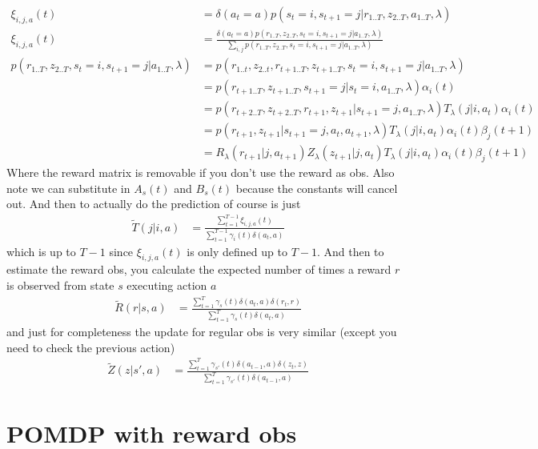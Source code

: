 \documentclass[10pt,english]{article}
\begin{document}
\begin{align}
\xi_{i,j,a}(t) &= \delta(a_t=a)p(s_t=i,s_{t+1}=j|r_{1..T},z_{2..T},a_{1..T},\lambda) \\
\xi_{i,j,a}(t) &= \frac{\delta(a_t=a)p(r_{1..T},z_{2..T},s_t=i,s_{t+1}=j|a_{1..T},\lambda)}{\sum_{i,j} p(r_{1..T},z_{2..T},s_t=i,s_{t+1}=j|a_{1..T},\lambda)}\\
p(r_{1..T},z_{2..T},s_t=i,s_{t+1}=j|a_{1..T},\lambda) &= p(r_{1..t},z_{2..t},r_{t+1..T},z_{t+1..T},s_t=i,s_{t+1}=j|a_{1..T},\lambda) \\
&= p(r_{t+1..T},z_{t+1..T},s_{t+1}=j|s_t=i,a_{1..T},\lambda) \alpha_i(t) \\
&= p(r_{t+2..T},z_{t+2..T},r_{t+1},z_{t+1}|s_{t+1}=j,a_{1..T},\lambda) T_\lambda(j|i,a_t) \alpha_i(t) \\
&= p(r_{t+1},z_{t+1}|s_{t+1}=j,a_{t},a_{t+1},\lambda) T_\lambda(j|i,a_t) \alpha_i(t) \beta_j(t+1) \\
&= R_\lambda(r_{t+1}|j,a_{t+1}) Z_\lambda(z_{t+1}|j,a_t) T_\lambda(j|i,a_t) \alpha_i(t) \beta_j(t+1)
\end{align}
Where the reward matrix is removable if you don't use the reward as obs. Also note we can substitute in $A_s(t)$ and $B_s(t)$ because the constants will cancel out. And then to actually do the prediction of course is just
\begin{align}
\tilde{T}(j|i,a) &= \frac{\sum_{t=1}^{T-1} \xi_{i,j,a}(t)}{\sum_{t=1}^{T-1} \gamma_i(t)\delta(a_t,a)}
\end{align}
which is up to $T-1$ since $\xi_{i,j,a}(t)$ is only defined up to $T-1$. And then to estimate the reward obs, you calculate the expected number of times a reward $r$ is observed from state $s$ executing action $a$
\begin{align}
\tilde{R}(r|s,a) &= \frac{\sum_{t=1}^T \gamma_s(t)\delta(a_t,a)\delta(r_t,r)}{\sum_{t=1}^T \gamma_s(t)\delta(a_t,a)}
\end{align}
and just for completeness the update for regular obs is very similar (except you need to check the previous action)
\begin{align}
\tilde{Z}(z|s',a) &= \frac{\sum_{t=1}^T \gamma_{s'}(t)\delta(a_{t-1},a)\delta(z_t,z)}{\sum_{t=1}^T \gamma_{s'}(t)\delta(a_{t-1},a)}
\end{align}

\section{POMDP with reward obs}
\end{document}
